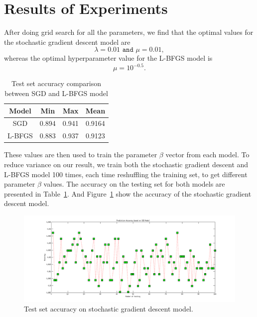 \documentclass{article} %
\begin{document}
\section{Results of Experiments}
\label{sec:results}


After doing grid search for all the parameters, we find that the optimal values for the stochastic gradient descent model are
\[\lambda = 0.01 \texttt{  and  } \mu = 0.01,\]
whereas the optimal hyperparameter value for the L-BFGS model is
\[\mu = 10^{-0.5}.\]

\begin{table}[h]
\caption{Test set accuracy comparison between SGD and L-BFGS model}
\centering
\begin{tabular}{c c c c}
\hline \hline
Model & Min & Max & Mean \\
\hline
SGD    & 0.894 & 0.941 & 0.9164  \\
L-BFGS & 0.883 & 0.937 & 0.9123 \\ [1ex]
\hline
\end{tabular}
\label{table:accuracy}
\end{table}

These values are then used to train the parameter $\beta$ vector from each model.
 To reduce variance on our result, we train both the stochastic gradient descent and L-BFGS model 100 times, each time reshuffling the training set, to get different parameter $\beta$ values.
 The accuracy on the testing set for both models are presented in Table~\ref{table:accuracy}.
 And Figure~\ref{fig:accuracy_sdg} show the accuracy of the stochastic gradient descent model.


\begin{figure}[ht!]
\centering
\includegraphics[width=\textwidth]{Accuracy_SDG.png}
\caption{Test set accuracy on stochastic gradient descent model.}
\label{fig:accuracy_sdg}
\end{figure}
\end{document}
